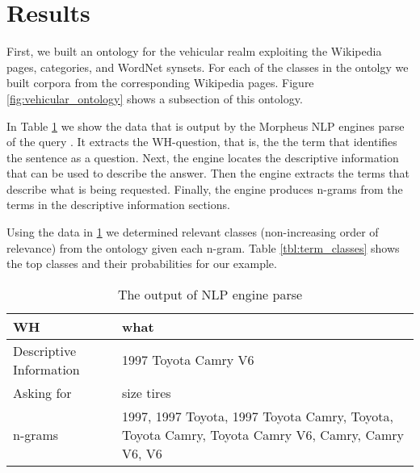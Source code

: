 \section{Results}
\label{sec:results}


First, we built an ontology for the vehicular realm exploiting the Wikipedia pages, categories, and WordNet synsets. For each of the classes in the ontolgy we built corpora from the corresponding Wikipedia pages. Figure \ref{fig:vehicular_ontology} shows a subsection of this ontology.

In Table \ref{tbl:nlp_engine_parse} we show the data that is output by the Morpheus NLP engines parse of the query .  It extracts the WH-question, that is, the the term that identifies the sentence as a question.  Next, the engine locates the descriptive information that can be used to describe the answer. Then the engine extracts the terms that describe what is being requested. Finally, the engine produces n-grams from the terms in the descriptive information sections.

Using the data in \ref{tbl:nlp_engine_parse} we determined relevant classes (non-increasing order of relevance) from the ontology given each n-gram. Table \ref{tbl:term_classes} shows the top classes and their probabilities for our example.


\begin{table}[h]\footnotesize
	\begin{tabular}{|l|p{4.2cm}|}
		\hline 
		WH & what \\
		\hline 
		Descriptive Information & 1997 Toyota Camry V6 \\
		\hline 
		Asking for & size tires \\
		\hline 
		n-grams & \small 1997, 1997 Toyota, 1997 Toyota Camry, Toyota, Toyota Camry, Toyota Camry V6, Camry, Camry V6, V6 \\
		\hline
	\end{tabular}
	\caption{The output of NLP engine parse}
	\label{tbl:nlp_engine_parse} 
\end{table}

